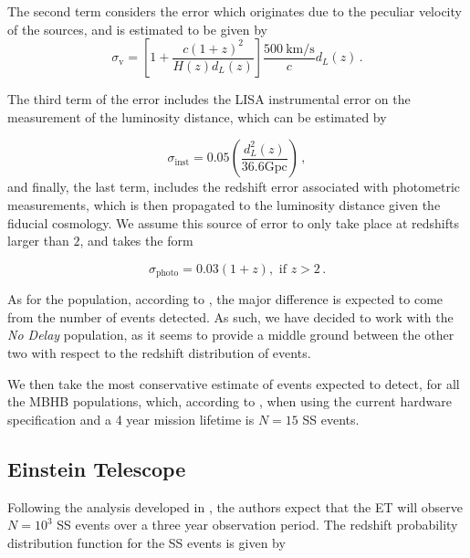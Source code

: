 \noindent The second term considers the error which originates due to the peculiar velocity of the sources, and is estimated to be given by
\begin{equation}
    \sigma_\text{v} = \left[ 1 + \frac{c(1+z)^2}{H(z)d_L(z)} \right] \frac{500 \ \text{km/s}}{c} d_L(z) \,.
\end{equation}

\noindent The third term of the error includes the \gls{LISA} instrumental error on the measurement of the luminosity distance, which can be estimated by

\begin{equation}
    \sigma_{\text{inst}} = 0.05 \left( \frac{d_L^2(z)}{36.6 \text{Gpc}} \right) \,,
\end{equation}
and finally, the last term, includes the redshift error associated with photometric measurements, which is then propagated to the luminosity distance given the fiducial cosmology. We assume this source of error to only take place at redshifts larger than $2$, and takes the form

\begin{equation}
    \sigma_{\text{photo}} = 0.03(1 + z), \text{ if $z > 2$} \,.
\end{equation}

As for the population, according to \cite{Speri2021}, the major difference is expected to come from the number of events detected. As such, we have decided to work with the \textit{No Delay} population, as it seems to provide a middle ground between the other two with respect to the redshift distribution of events.

We then take the most conservative estimate of events expected to detect, for all the \gls{MBHB} populations, which, according to \cite{Tamanini2017}, when using the current hardware specification and a 4 year mission lifetime is $N = 15$ \gls{SS} events.


\subsection{Einstein Telescope}
\label{subsec:ET}

Following the analysis developed in \cite{Belgacem2018}, the authors expect that the \gls{ET} will observe $N = 10^3$ \gls{SS} events over a three year observation period. The redshift probability distribution function for the \gls{SS} events is given by

